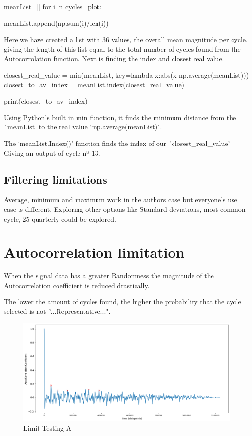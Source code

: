 \begin{python}
meanList=[]
for i in cycles_plot:

    meanList.append(np.sum(i)/len(i))
\end{python}

Here we have created a list with 36 values, the overall mean magnitude per cycle, giving the length of this list equal to the total number of cycles found from the Autocorrolation function. 
Next is finding the index and closest real value. 
\begin{python}
closest_real_value = min(meanList, key=lambda x:abs(x-np.average(meanList)))
closest_to_av_index = meanList.index(closest_real_value)

print(closest_to_av_index)
\end{python}

Using Python's built in min function, it finds the minimum distance from the ´meanList' to the real value ``np.average(meanList)". \cite{realValue}

The `meanList.Index()' function finds the index of our  ´closest\_real\_value' Giving an output of cycle nº 13.

\subsection{Filtering limitations}
Average, minimum and maximum work in the authors case but everyone's use case is different. Exploring other options like Standard deviations, most common cycle, 25 quarterly could be explored. 
\section{Autocorrelation limitation}\label{limitation}

When the signal data has a greater Randomness the magnitude of the Autocorrelation coefficient is reduced drastically. 

The lower the amount of cycles found, the higher the probability that the cycle selected is not ``...Representative...". 

\begin{figure}[h]
\centering
\includegraphics[scale=0.40]{images/autocorrolationBadCoefficentWithPeaks.png}
\caption{Limit Testing A}
\label{LimitA}
\end{figure}

